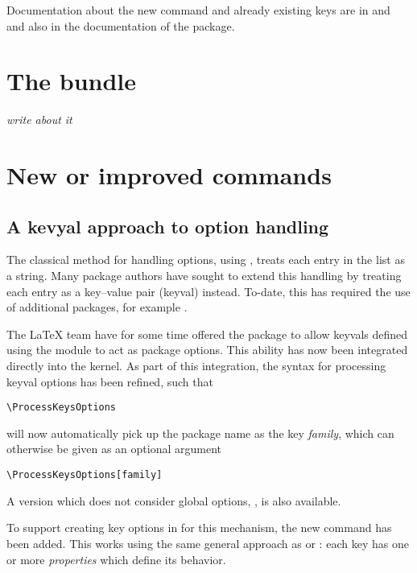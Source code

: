 \documentclass{ltnews}
\begin{document}
Documentation about the new command and
already existing keys are in  and 
and also in the documentation of the  package.


\section{The  bundle}

\emph{write about it}




\section{New or improved commands}

\subsection{A kevyal approach to option handling}

The classical \LaTeXe{} method for handling options, using ,
treats each entry in the list as a string. Many package authors have sought to
extend this handling by treating each entry as a key--value pair (keyval)
instead. To-date, this has required the use of additional packages, for example
.

The \LaTeX{} team have for some time offered the package  to
allow keyvals defined using the  module  to act as
package options. This ability has now been integrated directly into the kernel.
As part of this integration, the syntax for processing keyval options has been
refined, such that
\begin{verbatim}
\ProcessKeysOptions
\end{verbatim}
will now automatically pick up the package name as the key \emph{family}, which
can otherwise be given as an optional argument
\begin{verbatim}
\ProcessKeysOptions[family]
\end{verbatim}
A version which does not consider global options,
, is also available.

To support creating key options in for this mechanism, the new command
 has been added. This works using the same general
approach as  or : each key has one or more
\emph{properties} which define its behavior.
\end{document}
